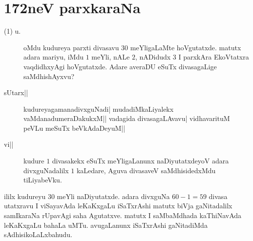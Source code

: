 \chapter{172neV parxkaraNa}


\begin{description}
\item[(1) u.] oMdu kudureya parxti divasavu $30$ meYligaLaMte
  hoVgutatxde. matutx adara mariyu, iMdu $1$ meYli, nALe $2$, nADidudx
  $3$ I parxkAra EkoVtatxra vaqdidhxyAgi hoVgutatxde. Adare averaDU
  eSuTx divasagaLige saMdhishAyxvu?

\item[sUtarx||] kudureyagamanadivxguNadi| mudadiMkaLiyalekx
  vaMdanadumeraDakukxM|| vadagida divasagaLAvavu| vidhavarituM peVLu
  meSuTx beVkAdaDeyuM||

\item[vi||] kudure $1$ divasakekx eSuTx meYligaLanunx naDiyutatxdeyoV
  adara divxguNadalilx $1$ kaLedare, Aguva divasaveV saMdhisidedxMdu
  tiLiyabeVku. 
\end{description}

ililx kudureyu $30$ meYli naDiyutatxde. adara divxguNa $60-1=59$
divasa utatxravu I viSayavAda leKaKxgaLu iSaTxrAshi matutx biVja
gaNitadalilx samIkaraNa rUpavAgi saha Agutatxve. matutx I saMbaMdhada
kaThiNavAda leKaKxgaLu bahaLa uMTu. avugaLanunx iSaTxrAshi gaNitadiMda
sAdhisikoLaLxbahudu. 

\vskip 1cm
